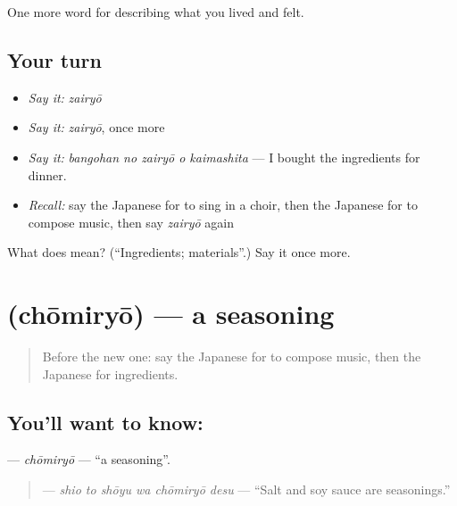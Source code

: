 \begin{grammarlens}[title={What you've built}]
One more word for describing what you lived and felt.
\end{grammarlens}

\subsection*{Your turn}
\begin{itemize}
\raggedright
  \item \emph{Say it:} \emph{zairyō}
  \item \emph{Say it:} \emph{zairyō}, once more
  \item \emph{Say it:} \emph{bangohan no zairyō o kaimashita} — I bought the ingredients for dinner.
  \item \emph{Recall:} say the Japanese for to sing in a choir, then the Japanese for to compose music, then say \emph{zairyō} again
\end{itemize}

\begin{tcolorbox}[breakable,colback=teal!4,colframe=teal!35!black,title={Before you move on}]
What does  mean? (\textquotedblleft{}Ingredients; materials\textquotedblright{}.) Say it once more.
\end{tcolorbox}
\section[\texorpdfstring{\ja{ちょうみりょう} (chōmiryō)}{ちょうみりょう (chōmiryō)}]{ (chōmiryō) — a seasoning}

\label{lesson:JA-C472-choumiryou}



\begin{quote}
Before the new one: say the Japanese for to compose music, then the Japanese for ingredients.
\end{quote}

\subsection*{You'll want to know: }
\textbf{} — \emph{chōmiryō} — \textquotedblleft{}a seasoning\textquotedblright{}.

\begin{quote}
\textbf{  } — \emph{shio to shōyu wa chōmiryō desu} — \textquotedblleft{}Salt and soy sauce are seasonings.\textquotedblright{}
\end{quote}

